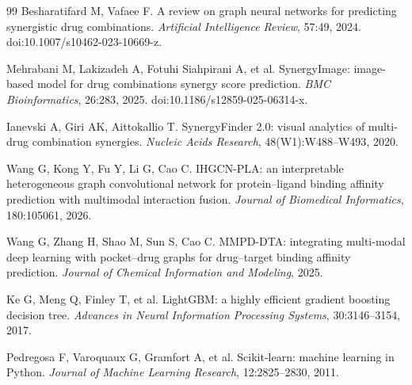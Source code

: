 \documentclass[11pt]{article}
\begin{document}
\begin{thebibliography}{99}
 Besharatifard M, Vafaee F.
A review on graph neural networks for predicting synergistic drug combinations.
\textit{Artificial Intelligence Review}, 57:49, 2024. doi:10.1007/s10462-023-10669-z.

 Mehrabani M, Lakizadeh A, Fotuhi Siahpirani A, et al.
SynergyImage: image-based model for drug combinations synergy score prediction.
\textit{BMC Bioinformatics}, 26:283, 2025. doi:10.1186/s12859-025-06314-x.

 Ianevski A, Giri AK, Aittokallio T.
SynergyFinder 2.0: visual analytics of multi-drug combination synergies.
\textit{Nucleic Acids Research}, 48(W1):W488--W493, 2020.

 Wang G, Kong Y, Fu Y, Li G, Cao C.
IHGCN-PLA: an interpretable heterogeneous graph convolutional network for protein--ligand binding
affinity prediction with multimodal interaction fusion.
\textit{Journal of Biomedical Informatics}, 180:105061, 2026.

 Wang G, Zhang H, Shao M, Sun S, Cao C.
MMPD-DTA: integrating multi-modal deep learning with pocket--drug graphs for drug--target binding
affinity prediction.
\textit{Journal of Chemical Information and Modeling}, 2025.

 Ke G, Meng Q, Finley T, et al.
LightGBM: a highly efficient gradient boosting decision tree.
\textit{Advances in Neural Information Processing Systems}, 30:3146--3154, 2017.

 Pedregosa F, Varoquaux G, Gramfort A, et al.
Scikit-learn: machine learning in Python.
\textit{Journal of Machine Learning Research}, 12:2825--2830, 2011.
\end{thebibliography}
\end{document}
